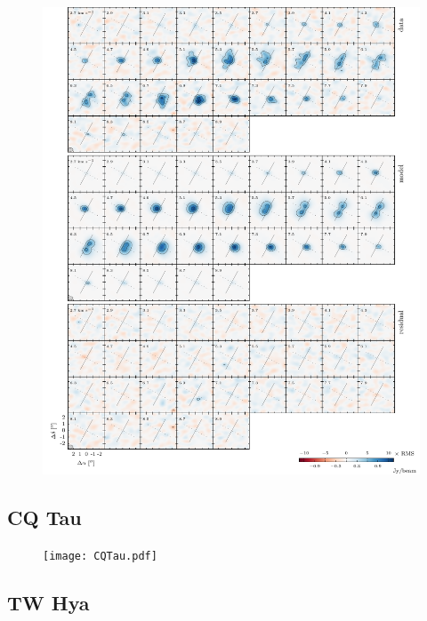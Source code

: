 \documentclass{aastex6}
\begin{document}
\begin{figure}[htb]
\begin{center}
  \includegraphics{MWC758.pdf}
  \end{center}
\end{figure}

\subsection{CQ Tau}

\begin{figure}[htb]
\begin{center}
  \texttt{[image: CQTau.pdf]}
  \end{center}
\end{figure}

\subsection{TW Hya}
\end{document}
